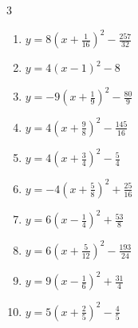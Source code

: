 \begin{multicols}{3}
\begin{enumerate}
  \item $\displaystyle y=8\left( x+\frac{1}{16}\right)^{2}-\frac{257}{32}$


  \item $\displaystyle y=4\left( x-1\right)^{2}-8$

        \phantom{$\displaystyle 頂点\left( 1 , -8 \right)$}

  \item $\displaystyle y=-9\left( x+\frac{1}{9}\right)^{2}-\frac{80}{9}$


  \item $\displaystyle y=4\left( x+\frac{9}{8}\right)^{2}-\frac{145}{16}$


  \item $\displaystyle y=4\left( x+\frac{3}{4}\right)^{2}-\frac{5}{4}$


  \item $\displaystyle y=-4\left( x+\frac{5}{8}\right)^{2}+\frac{25}{16}$


  \item $\displaystyle y=6\left( x-\frac{1}{4}\right)^{2}+\frac{53}{8}$


  \item $\displaystyle y=6\left( x+\frac{5}{12}\right)^{2}-\frac{193}{24}$


  \item $\displaystyle y=9\left( x-\frac{1}{6}\right)^{2}+\frac{31}{4}$


\columnbreak %

\resetques

  \item $\displaystyle y=5\left( x+\frac{2}{5}\right)^{2}-\frac{4}{5}$


\end{enumerate}
\end{multicols}
